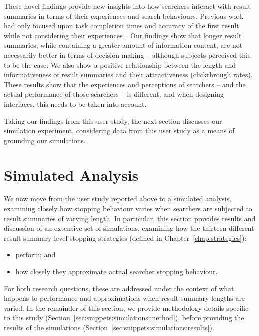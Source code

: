These novel findings provide new insights into how searchers interact with result summaries in terms of their experiences and search behaviours. Previous work had only focused upon task completion times and accuracy of the first result while not considering their experiences~\citep{cutrell2007eye_tracking, kaisser2008improving}. Our findings show that longer result summaries, while containing a greater amount of information content, are not necessarily better in terms of decision making -- although subjects perceived this to be the case. We also show a positive relationship between the length and informativeness of result summaries and their attractiveness (clickthrough rates). These results show that the experiences and perceptions of searchers -- and the actual performance of those searchers -- is different, and when designing interfaces, this needs to be taken into account.

Taking our findings from this user study, the next section discusses our simulation experiment, considering data from this user study as a means of grounding our simulations.

\section{Simulated Analysis}\label{sec:snippets:simulations}
We now move from the user study reported above to a simulated analysis, examining closely how stopping behaviour varies when searchers are subjected to result summaries of varying length. In particular, this section provides results and discussion of an extensive set of simulations, examining how the thirteen different result summary level stopping strategies (defined in Chapter~\ref{chap:strategies}):

\begin{itemize}
    \item{ perform; and}
    \item{ how closely they approximate actual searcher stopping behaviour.}
\end{itemize}

For both research questions, these are addressed under the context of what happens to performance and approximations when result summary lengths are varied. In the remainder of this section, we provide methodology details specific to this study (Section~\ref{sec:snippets:simulations:method}), before providing the results of the simulations (Section~\ref{sec:snippets:simulations:results}).

